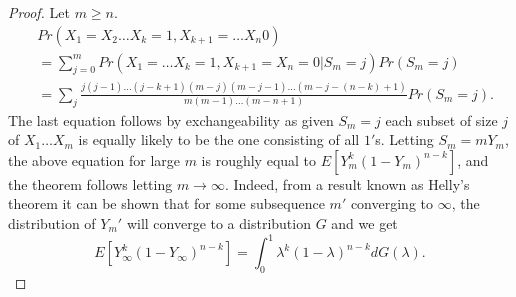 \documentclass[a4paper,10pt]{article}
\theoremstyle{plain}
\theoremstyle{definition}
\theoremstyle{remark}
\begin{document}
\begin{proof}
Let $m \geq n $.
\begin{eqnarray*}
&Pr(X_1 = X_2 \hdots X_k =1, X_{k+1}= \hdots X_n 0 )\\
&=\sum_{j=0}^{m}Pr(X_1=\hdots X_k=1, X_{k+1}= X_{n}=0|S_m=j)Pr(S_m=j)\\
&=\sum_{j} \frac{j(j-1) \hdots (j-k+1)(m-j)(m-j-1) \hdots (m-j-(n-k)+1) }{m(m-1) \hdots (m-n+1)}Pr(S_m=j).
\end{eqnarray*}
The last equation follows by exchangeability as given $S_m=j$ each subset of size $j$ of $X_1 \hdots X_m$ is equally likely to be the one consisting of all $1'$s. Letting $S_m=mY_m$, the above equation for large $m$ is roughly equal to $E[Y_m^k(1-Y_m)^{n-k}]$, and the theorem follows letting $m \rightarrow \infty$. Indeed, from a result known as  Helly's theorem it can be shown that for some subsequence $m'$ converging to $\infty$, the distribution of $Y_m'$ will converge to a distribution $G$ and we get
\begin{equation*}
E[Y_{\infty}^k(1-Y_{\infty})^{n-k}] = \int_0^1 \lambda^k(1-\lambda)^{n-k}dG(\lambda).
\end{equation*} 
\end{proof}
\end{document}
